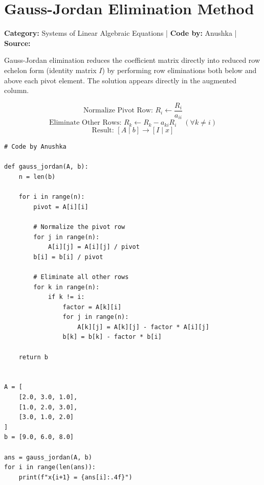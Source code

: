 \documentclass[10pt,a4paper]{report}
\begin{document}
\newpage

\section{Gauss-Jordan Elimination Method}
\textbf{Category:} \textcolor{secondary}{Systems of Linear Algebraic Equations} \quad | \quad \textbf{Code by:} \textcolor{secondary}{Anushka} \quad | \quad \textbf{Source:} \texttt{}

Gauss-Jordan elimination reduces the coefficient matrix directly into reduced row echelon form (identity matrix $I$) by performing row eliminations both below and above each pivot element. The solution appears directly in the augmented column.

\begin{tcolorbox}[colback=theorybg,colframe=theoryframe,title=\textbf{Mathematical Theory \& Formulation},boxrule=1pt,arc=2mm]
\[
\text{Normalize Pivot Row: } R_i \leftarrow \frac{R_i}{a_{ii}}
\]
\[
\text{Eliminate Other Rows: } R_k \leftarrow R_k - a_{ki} R_i \quad (\forall k \neq i)
\]
\[
\text{Result: } [A \mid b] \longrightarrow [I \mid x]
\]
\end{tcolorbox}

\begin{tcolorbox}[colback=codebg,colframe=secondary,title=\textbf{Python Implementation (Step-by-Step Loops \& Pure Functions)},boxrule=1pt,arc=2mm]
\begin{lstlisting}[style=python_detailed]
# Code by Anushka

def gauss_jordan(A, b):
    n = len(b)

    for i in range(n):
        pivot = A[i][i]

        # Normalize the pivot row
        for j in range(n):
            A[i][j] = A[i][j] / pivot
        b[i] = b[i] / pivot

        # Eliminate all other rows
        for k in range(n):
            if k != i:
                factor = A[k][i]
                for j in range(n):
                    A[k][j] = A[k][j] - factor * A[i][j]
                b[k] = b[k] - factor * b[i]

    return b


A = [
    [2.0, 3.0, 1.0],
    [1.0, 2.0, 3.0],
    [3.0, 1.0, 2.0]
]
b = [9.0, 6.0, 8.0]

ans = gauss_jordan(A, b)
for i in range(len(ans)):
    print(f"x{i+1} = {ans[i]:.4f}")

\end{lstlisting}
\end{tcolorbox}
\end{document}

